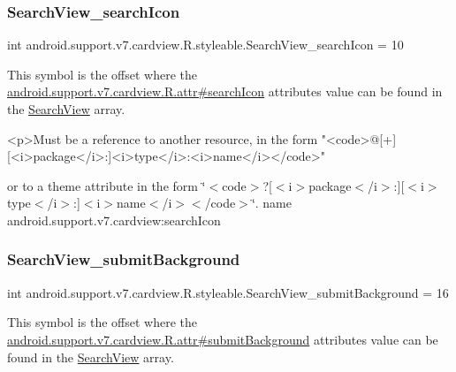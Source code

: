 \subsubsection{\texorpdfstring{Search\+View\+\_\+search\+Icon}{SearchView\_searchIcon}}
{\footnotesize\ttfamily int android.\+support.\+v7.\+cardview.\+R.\+styleable.\+Search\+View\+\_\+search\+Icon = 10\hspace{0.3cm}{\ttfamily [static]}}

This symbol is the offset where the \hyperlink{classandroid_1_1support_1_1v7_1_1cardview_1_1R_1_1attr_a50c88825d8b7297a04320d1b339090dd}{android.\+support.\+v7.\+cardview.\+R.\+attr\#search\+Icon} attribute\textquotesingle{}s value can be found in the \hyperlink{classandroid_1_1support_1_1v7_1_1cardview_1_1R_1_1styleable_a6a300ecad88f70a7642265f73ff4d33f}{Search\+View} array.

\begin{DoxyVerb}      <p>Must be a reference to another resource, in the form "<code>@[+][<i>package</i>:]<i>type</i>:<i>name</i></code>"
\end{DoxyVerb}
 or to a theme attribute in the form \char`\"{}$<$code$>$?\mbox{[}$<$i$>$package$<$/i$>$\+:\mbox{]}\mbox{[}$<$i$>$type$<$/i$>$\+:\mbox{]}$<$i$>$name$<$/i$>$$<$/code$>$\char`\"{}.  name android.\+support.\+v7.\+cardview\+:search\+Icon \mbox{\label{classandroid_1_1support_1_1v7_1_1cardview_1_1R_1_1styleable_a7d4e946a7b0ee85b63f28d0ee6b9afde}} 
\subsubsection{\texorpdfstring{Search\+View\+\_\+submit\+Background}{SearchView\_submitBackground}}
{\footnotesize\ttfamily int android.\+support.\+v7.\+cardview.\+R.\+styleable.\+Search\+View\+\_\+submit\+Background = 16\hspace{0.3cm}{\ttfamily [static]}}

This symbol is the offset where the \hyperlink{classandroid_1_1support_1_1v7_1_1cardview_1_1R_1_1attr_ad1f2599c7421633a092dd0dc4f166d8a}{android.\+support.\+v7.\+cardview.\+R.\+attr\#submit\+Background} attribute\textquotesingle{}s value can be found in the \hyperlink{classandroid_1_1support_1_1v7_1_1cardview_1_1R_1_1styleable_a6a300ecad88f70a7642265f73ff4d33f}{Search\+View} array.

